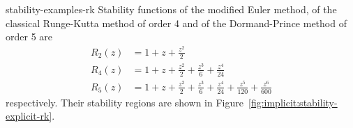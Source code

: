 \begin{Example}{stability-examples-rk}
  Stability functions of the modified Euler method, of the classical
  Runge-Kutta method of order 4 and of the Dormand-Prince method of
  order 5 are
  \begin{align*}
    R_2(z) &= 1 + z + \tfrac{z^2}2 \\
    R_4(z) &= 1 + z + \tfrac{z^2}2 + \tfrac{z^3}{6} + \tfrac{z^4}{24}\\
    R_5(z) &= 1 + z + \tfrac{z^2}2 + \tfrac{z^3}{6} + \tfrac{z^4}{24}
             + \tfrac{z^5}{120} + \tfrac{z^6}{600}
  \end{align*}
  respectively. Their stability regions are shown in
  Figure~\ref{fig:implicit:stability-explicit-rk}.
\end{Example}

